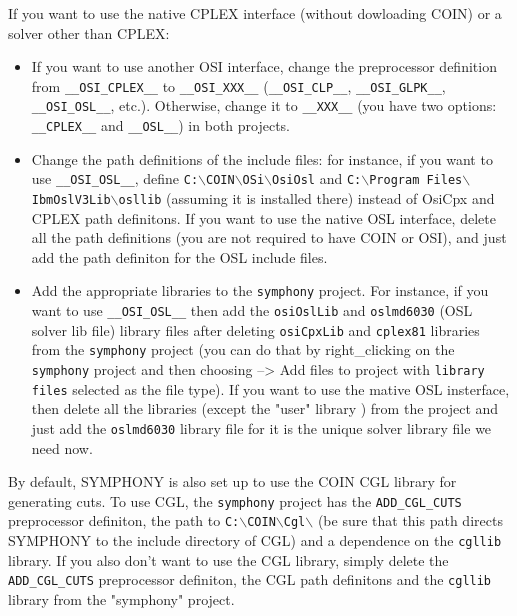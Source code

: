 \begin{itemize}
{\begin{itemize}
\end{itemize}

If you want to use the native CPLEX interface (without dowloading COIN) or a
solver other than CPLEX:

\begin{itemize}

\item If you want to use another OSI interface, change the preprocessor
definition from \texttt{\_\_OSI\_CPLEX\_\_} to \texttt{\_\_OSI\_XXX\_\_}
(\texttt{\_\_OSI\_CLP\_\_}, \texttt{\_\_OSI\_GLPK\_\_}, \texttt{\_\_OSI\_OSL\_\_},
etc.). Otherwise, change it to \texttt{\_\_XXX\_\_} (you have two options:
\texttt{\_\_CPLEX\_\_} and \texttt{\_\_OSL\_\_}) in both projects.

\item Change the path definitions of the include files: for instance, if you want
to use \texttt{\_\_OSI\_OSL\_\_}, define
\texttt{C:$\backslash$COIN$\backslash$OSi$\backslash$OsiOsl} and \texttt{C:$\backslash$Program
Files$\backslash$IbmOslV3Lib$\backslash$osllib} (assuming it is installed
there) instead of OsiCpx and CPLEX path definitons. If you want to use the
native OSL interface, delete all the path definitions (you are not required to
have COIN or OSI), and just add the path definiton for the OSL include files.

\item Add the appropriate libraries to the \texttt{symphony} project. For
instance, if you want to use \texttt{\_\_OSI\_OSL\_\_} then add the
\texttt{osiOslLib} and \texttt{oslmd6030} (OSL solver lib file) library files
after deleting \texttt{osiCpxLib} and \texttt{cplex81} libraries from the
\texttt{symphony} project (you can do that by right_clicking on the
\texttt{symphony} project and then choosing --> Add files to project with
\texttt{library files} selected as the file type). If 
you want to use the mative OSL insterface, then delete all the libraries
(except the "user" library ) from the  project and just add
the \texttt{oslmd6030} library file for it is the unique solver library file
we need now.

\end{itemize}

\item By default, SYMPHONY is also set up to use the COIN CGL library for
generating cuts. To use CGL, the \texttt{symphony} project has the
\texttt{ADD_CGL_CUTS} preprocessor definiton, the path to
\texttt{C:$\backslash$COIN$\backslash$Cgl$\backslash$} (be sure that this path
directs SYMPHONY to the include directory of CGL) and a dependence on the
\texttt{cgllib} library. If you also don't want to use the CGL library, simply
delete the \texttt{ADD_CGL_CUTS} preprocessor definiton, the CGL path
definitons and the \texttt{cgllib} library from the "symphony" project.

}
\end{itemize}
